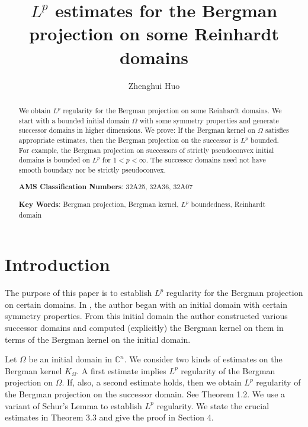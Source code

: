 \documentclass[reqno,12pt]{amsart}
\author{Zhenghui Huo}
\title{$L^p$ estimates for the Bergman projection on some Reinhardt domains}
\numberwithin{equation}{section}
\begin{document}
	\address{Dept. of Mathematics, Washington University in St. Louis, 1 Brookings Dr., St. Louis MO 63130}
		\newtheorem{thm}{Theorem}[section]
	\newtheorem{cl}[thm]{Claim}
	\newtheorem{lem}[thm]{Lemma}
		\newtheorem*{Rmk*}{Remark}
	\newtheorem{ex}[thm]{Example}
	\newtheorem{de}[thm]{Definition}
	\newtheorem{co}[thm]{Corollary}
	\newtheorem*{thm*}{Theorem}
	\maketitle
\begin{abstract}
	We obtain $L^p$ regularity for the Bergman projection on some Reinhardt domains. We start with a bounded initial domain $\Omega$ with some symmetry properties and generate  successor domains in higher {dimensions}. We prove: If the Bergman kernel on $\Omega$ satisfies appropriate estimates, then the Bergman projection on the successor is $L^p$ bounded. For example, the Bergman projection on successors of strictly pseudoconvex initial domains is bounded on $L^p$ for $1<p<\infty$. The successor domains need not have smooth boundary nor be strictly pseudoconvex.

\medskip

\noindent
{\bf AMS Classification Numbers}: 32A25, 32A36, 32A07

\medskip

\noindent
{\bf Key Words}: Bergman projection, Bergman kernel, $L^p$ boundedness, Reinhardt domain
\end{abstract}

\section{Introduction}
The purpose of this paper is to establish $L^p$ regularity for the Bergman projection on certain domains. In \cite{Zhenghui}, {the author} began with an initial domain with certain symmetry properties. From this initial domain {the author} constructed various successor domains and computed (explicitly) the Bergman kernel on them in terms of the Bergman kernel on the initial domain.

Let $\Omega$ be an initial domain {in $\mathbb C^n$}. We consider two kinds of estimates on the Bergman kernel $K_{\Omega}$. {A first estimate} implies $L^p$ regularity of the Bergman projection on $\Omega$. If, also, {a second estimate} holds, then we obtain $L^p$ regularity of the Bergman projection on the successor domain. See Theorem 1.2.
{We use a variant of Schur's Lemma to establish $L^p$ regularity.  We state the crucial estimates in Theorem 3.3 and give the proof in Section 4.}
\end{document}
